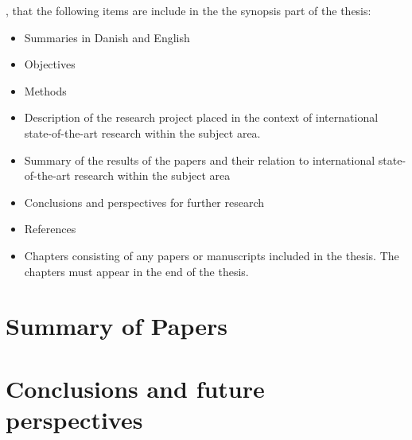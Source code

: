 
, that the following items are include
in the the synopsis part of the thesis:

\begin{itemize}
    \item Summaries in Danish and English 
    \item Objectives
    \item Methods
    \item Description of the research project 
    placed in the context of international state-of-the-art research
    within the subject area.
    \item Summary of the results of the papers 
    and their relation to international state-of-the-art research
    within the subject area
    \item Conclusions and perspectives for further research
    \item References
    \item Chapters consisting of
    any papers or manuscripts included in the thesis. 
    The chapters must appear in the end of the thesis.
\end{itemize}


\chapter{Summary of Papers}
\chapter{Conclusions and future perspectives}


\section{}
\section{}
\section{}
\section{}
\chapter{}
